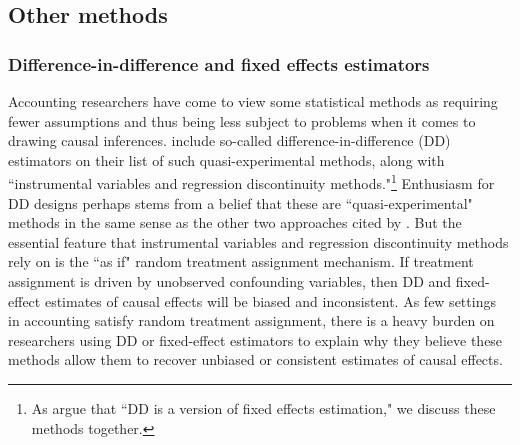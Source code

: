\documentclass[12pt,reqno,titlepage]{amsart}
\theoremstyle{definition}
\begin{document}
\begin{doublespace}


\subsection{Other methods}

\subsubsection{Difference-in-difference and fixed effects estimators}
Accounting researchers have come to view some statistical methods as requiring fewer assumptions and thus being less subject to problems when it comes to drawing causal inferences. 
\citet[p.\,12]{Angrist:2010jv} include so-called difference-in-difference (DD) estimators on their list of such quasi-experimental methods, along with ``instrumental variables and regression discontinuity methods."\footnote{As \citet[p.\,228]{Angrist:2008vk} argue that ``DD is a version of fixed effects estimation," we discuss these methods together.}
Enthusiasm for DD designs perhaps stems from a belief that these are ``quasi-experimental" methods in the same sense as the other two approaches cited by \citet[p.\,12]{Angrist:2010jv}.
But the essential feature that instrumental variables and regression discontinuity methods rely on is the ``as if" random treatment assignment mechanism.
If treatment assignment is driven by unobserved confounding variables, then DD and fixed-effect estimates of causal effects will be biased and inconsistent. 
As few settings in accounting satisfy random treatment assignment, there is a heavy burden on researchers using DD or fixed-effect estimators to explain why they believe these methods allow them to recover unbiased or consistent estimates of causal effects.


\end{doublespace}
\end{document}
